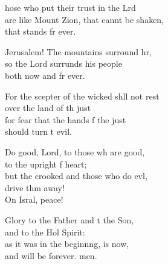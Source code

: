 \settowidth{\versewidth}{For the scepter of the wicked shall not rest *}
\begin{psalmverse}%
  \begin{patverse}
hose who put their trust in the Lrd\Flex\\
are like Mount Zion, that cannt be shaken,\Med\\
that stands fr ever.

Jerusalem! The mountains surround hr,\Flex\\
so the Lord surrunds his people\Med\\
both now and fr ever.

For the scepter of the wicked shll not rest\Med\\
over the land of th just\\
for fear that the hands f the just\Med\\
should turn t evil.

Do good, Lord, to those wh are good,\Med\\
to the upright f heart;\\
but the crooked and those who do ev\pointup{\i}l,\Flex\\
drive thm away!\Med\\
On Isral, peace!

Glory to the Father and t the Son,\Med\\
and to the Hol Spirit:\\
as it was in the beginn\pointup{\i}ng, is now,\Med\\
and will be forever. men.
  \end{patverse}
\end{psalmverse}

